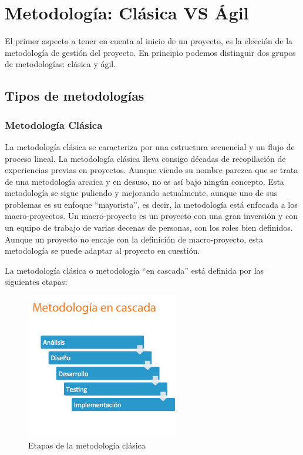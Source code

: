 \chapter{Metodología: Clásica VS Ágil}

El primer aspecto a tener en cuenta al inicio de un proyecto, es la elección de la metodología de gestión del proyecto. En principio podemos distinguir dos grupos de metodologías: clásica y ágil.

\section{Tipos de metodologías}

\subsection*{Metodología Clásica}

La metodología clásica se caracteriza por una estructura secuencial y un flujo de proceso lineal. La metodología clásica lleva consigo décadas de recopilación de experiencias previas en proyectos. Aunque viendo su nombre parezca que se trata de una metodología arcaica y en desuso, no es así bajo ningún concepto. Esta metodología se sigue puliendo y mejorando actualmente, aunque uno de sus problemas es su enfoque ``mayorista'', es decir, la metodología está enfocada a los macro-proyectos. Un macro-proyecto es un proyecto con una gran inversión y con un equipo de trabajo de varias decenas de personas, con los roles bien definidos. Aunque un proyecto no encaje con la definición de macro-proyecto, esta metodología se puede adaptar al proyecto en cuestión.

La metodología clásica o metodología ``en cascada'' está definida por las siguientes etapas:

\begin{figure}[h]
    \centering
    \includegraphics[width=0.6\textwidth]{imagenes/metodologia/meto_clasica.jpg}
    \caption{Etapas de la metodología clásica}
\end{figure}

